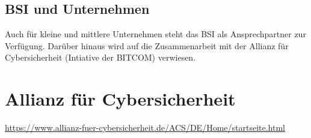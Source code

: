 \subsection{BSI und Unternehmen}

Auch für kleine und mittlere Unternehmen steht das BSI als Ansprechpartner zur Verfügung. Darüber hinaus wird auf die Zusammenarbeit mit der Allianz für Cybersicherheit (Intiative der BITCOM) verwiesen.

\section{Allianz für Cybersicherheit}

\url{https://www.allianz-fuer-cybersicherheit.de/ACS/DE/Home/startseite.html}